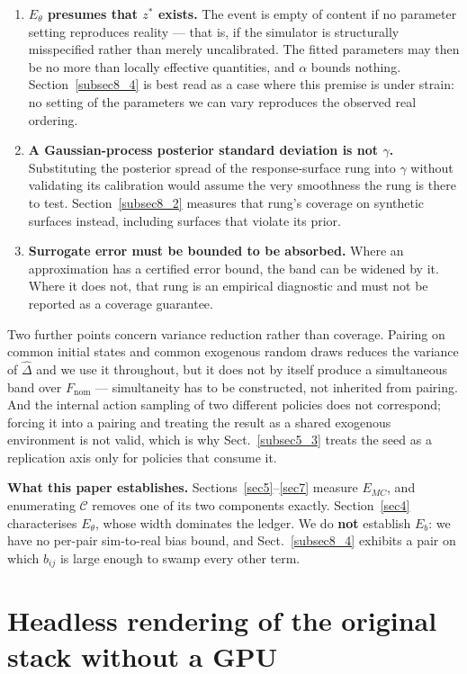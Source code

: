\documentclass[pdflatex,iicol,sn-apa]{sn-jnl}
\theoremstyle{remark}
\begin{document}
\begin{appendices}
\begin{enumerate}
\item \textbf{$E_\theta$ presumes that $z^*$ exists.} The event is empty of content if no
parameter setting reproduces reality --- that is, if the simulator is structurally misspecified
rather than merely uncalibrated. The fitted parameters may then be no more than locally effective
quantities, and $\alpha$ bounds nothing. Section~\ref{subsec8_4} is best read as a case where this
premise is under strain: no setting of the parameters we can vary reproduces the observed real
ordering.

\item \textbf{A Gaussian-process posterior standard deviation is not $\gamma$.} Substituting the
posterior spread of the response-surface rung into $\gamma$ without validating its calibration
would assume the very smoothness the rung is there to test. Section~\ref{subsec8_2} measures that
rung's coverage on synthetic surfaces instead, including surfaces that violate its prior.

\item \textbf{Surrogate error must be bounded to be absorbed.} Where an approximation has a
certified error bound, the band can be widened by it. Where it does not, that rung is an empirical
diagnostic and must not be reported as a coverage guarantee.
\end{enumerate}

Two further points concern variance reduction rather than coverage. Pairing on common initial states
and common exogenous random draws reduces the variance of $\hat\Delta$ and we use it throughout,
but it does not by itself produce a simultaneous band over $F_{\mathrm{nom}}$ --- simultaneity has to be
constructed, not inherited from pairing. And the internal action sampling of two different policies
does not correspond; forcing it into a pairing and treating the result as a shared exogenous
environment is not valid, which is why Sect.~\ref{subsec5_3} treats the seed as a replication axis
only for policies that consume it.

\textbf{What this paper establishes.} Sections~\ref{sec5}--\ref{sec7} measure $E_{MC}$, and
enumerating $\mathcal{C}$ removes one of its two components exactly. Section~\ref{sec4}
characterises $E_\theta$, whose width dominates the ledger. We do \textbf{not} establish $E_b$: we
have no per-pair sim-to-real bias bound, and Sect.~\ref{subsec8_4} exhibits a pair on which
$b_{ij}$ is large enough to swamp every other term.

\section{Headless rendering of the original stack without a GPU}\label{secB}


\end{appendices}
\end{document}
